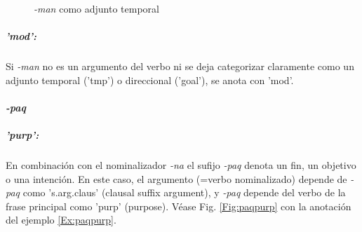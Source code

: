 \documentclass[a4paper,11pt,DIV12]{scrartcl}
\begin{document}
\begin{figure}
 \begin{center}
\end{center}
\caption{{\em -man} como adjunto temporal}\label{Fig:mantmp}
\end{figure}



\subparagraph{'mod':}
Si {\em -man} no es un argumento del verbo ni se deja categorizar claramente como un adjunto temporal ('tmp') o direccional ('goal'), se anota con 'mod'. 



\paragraph{{\em -paq}}
\subparagraph{'purp':}\label{Sec:paqpurp} En combinaci\'on con el nominalizador {\em -na} el sufijo {\em -paq} denota un fin, un objetivo o una intenci\'on. En este caso, el argumento (=verbo nominalizado) depende de {\em -paq} como 's.arg.claus' (clausal suffix argument), y {\em -paq} depende del verbo de la frase principal como 'purp' (purpose). V\'ease Fig. \ref{Fig:paqpurp} con la anotaci\'on del ejemplo \ref{Ex:paqpurp}.
\end{document}
